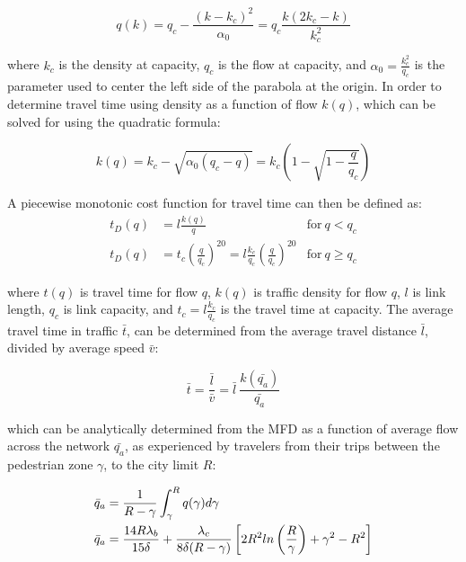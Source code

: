 \documentclass{article}
\begin{document}
\begin{equation}
    q(k) = q_{c} - \frac{\left(k-k_{c}\right)^{2}}{\alpha_0} = q_{c}\frac{k\left(2k_{c}-k\right)}{k_{c}^{2}}
\end{equation}

\noindent where $k_c$ is the density at capacity, $q_c$ is the flow at capacity, and $\alpha_0 = \frac{k_c^2}{q_c}$ is the parameter used to center the left side of the parabola at the origin. In order to determine travel time using density as a function of flow $k(q)$, which can be solved for using the quadratic formula:

\begin{equation}
    k(q) = k_{c}-\sqrt{\alpha_0\left(q_{c}-q\right)} = k_c \left(1 - \sqrt{1- \frac{q}{q_c}} \right)
    \label{eq:densityparabolic}
\end{equation}

\noindent A piecewise monotonic cost function for travel time can then be defined as:
\begin{subequations}
\begin{align}
    t_D(q) &= l \frac{k(q)}{q} & \text{for}~q < q_c \\
    t_D(q) &= t_c \left(\frac{q}{q_c}\right)^{20} = l\frac{k_c}{q_c} \left(\frac{q}{q_c}\right)^{20} & \text{for}~q \geq q_c
\end{align}
\end{subequations}

\noindent where $t(q)$ is travel time for flow $q$, $k(q)$ is traffic density for flow $q$, $l$ is link length, $q_c$ is link capacity, and $t_c = l\frac{k_c}{q_c}$ is the travel time at capacity. The average travel time in traffic $\bar{t}$, can be determined from the average travel distance $\bar{l}$, divided by average speed $\bar{v}$:

\begin{equation}
    \bar{t} = \frac{\bar{l}}{\bar{v}} = \bar{l}~\frac{k\left(\bar{q_a}\right)}{\bar{q_a}}
\end{equation}

\noindent which can be analytically determined from the MFD as a function of average flow across the network $\bar{q_a}$, as experienced by travelers from their trips between the pedestrian zone $\gamma$, to the city limit $R$:

\begin{align}
    \bar{q}_a & = \frac{1}{R-\gamma}\int_\gamma^R q(\gamma) d\gamma \notag\\
    \bar{q}_a & = \frac{14R\lambda_{b}}{15\delta} +  \frac{\lambda_{c}}{8\delta (R - \gamma)} \left[ 2R^{2} ln \left( \frac{R}{\gamma}\right) + \gamma^{2} - R^{2}\right]
\end{align}
\end{document}

